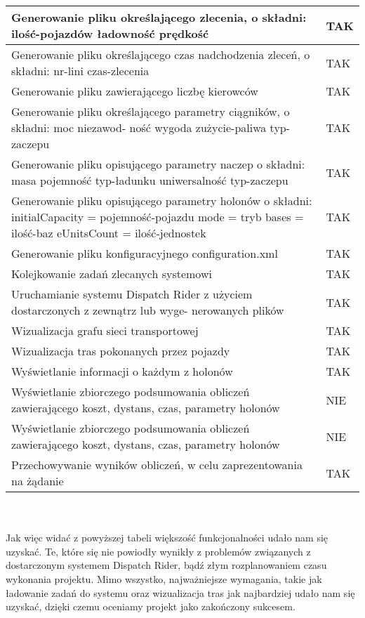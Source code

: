 \begin{tabularx}{\textwidth}{ |X|p{2cm}| }
  \hline
  Generowanie pliku określającego zlecenia, o składni: ilość-pojazdów ładowność
prędkość
 & TAK  \\
  \hline
  Generowanie pliku określającego czas nadchodzenia zleceń, o składni: nr-lini czas-zlecenia  & TAK  \\
  \hline
  Generowanie pliku zawierającego liczbę kierowców & TAK \\
  \hline
  Generowanie pliku określającego parametry ciągników, o składni: moc niezawod-
ność wygoda zużycie-paliwa typ-zaczepu & TAK \\
  \hline
  Generowanie pliku opisującego parametry naczep o składni: masa pojemność
typ-ładunku uniwersalność typ-zaczepu & TAK \\
  \hline
  Generowanie pliku opisującego parametry holonów o składni: initialCapacity =
pojemność-pojazdu mode = tryb bases = ilość-baz eUnitsCount = ilość-jednostek & TAK \\
  \hline
  Generowanie pliku konfiguracyjnego configuration.xml & TAK \\
  \hline
  Kolejkowanie zadań zlecanych systemowi & TAK \\
  \hline
  Uruchamianie systemu Dispatch Rider z użyciem dostarczonych z zewnątrz lub wyge-
nerowanych plików & TAK \\
  \hline
  Wizualizacja grafu sieci transportowej & TAK \\
  \hline
  Wizualizacja tras pokonanych przez pojazdy & TAK \\
  \hline
  Wyświetlanie informacji o każdym z holonów & TAK \\
  \hline
  Wyświetlanie zbiorczego podsumowania obliczeń zawierającego koszt, dystans, czas, parametry holonów & NIE \\
  \hline
  Wyświetlanie zbiorczego podsumowania obliczeń zawierającego koszt, dystans, czas,
parametry holonów & NIE \\
  \hline 
  Przechowywanie wyników obliczeń, w celu zaprezentowania na żądanie & TAK \\
  \hline
\end{tabularx}
\\ \\
Jak więc widać z powyższej tabeli większość funkcjonalności udało nam się uzyskać. Te, które się nie powiodły
wynikły z problemów związanych z dostarczonym systemem Dispatch Rider, bądź złym rozplanowaniem czasu wykonania
projektu. Mimo wszystko, najważniejsze wymagania, takie jak ładowanie zadań do systemu oraz wizualizacja tras
jak najbardziej udało nam się uzyskać, dzięki czemu oceniamy projekt jako zakończony sukcesem.